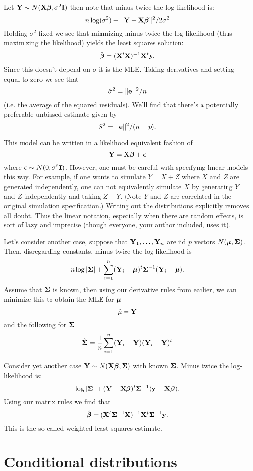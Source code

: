 Let $\mathbf{Y} \sim N(\mathbf{X} \boldsymbol{\beta}, \sigma^2 \mathbf{I})$ then note that 
minus twice the log-likelihood is:
$$
n\log(\sigma^2) + ||\mathbf{Y} - \mathbf{X} \boldsymbol{\beta}||^2 / 2\sigma^2
$$
Holding $\sigma^2$ fixed we see that minmizing minus twice
the log likelihood (thus maximizing the likelihood) yields
the least squares solution:
$$
\hat {\boldsymbol{\beta}} = (\mathbf{X}^t \mathbf{X})^{-1} \mathbf{X}^t \mathbf{y}.
$$
Since this doesn't depend on $\sigma$ it is the MLE. 
Taking derivatives and setting equal to zero we
see that 
$$
\hat \sigma^2 = ||\mathbf{e}||^2 / n
$$
(i.e. the average of the squared residuals). We'll
find that there's a potentially preferable unbiased
estimate given by
$$
S^2 = ||\mathbf{e}||^2 / (n - p).
$$

This model can be written in a  likelihood equivalent fashion
of  
$$
\mathbf{Y} = \mathbf{X} \boldsymbol{\beta} + \boldsymbol{\epsilon}
$$
where $\boldsymbol{\epsilon} \sim N(0, \sigma^2 \mathbf{I})$. However, one
must be careful with specifying linear models this way.
For example, if one wants to simulate $Y = X + Z$ where $X$ and $Z$ are generated
independently, one can not equivalently simulate $X$
by generating $Y$ and $Z$ independently and taking $Z - Y$.
(Note $Y$ and $Z$ are correlated in the original simulation specification.)
Writing out the distributions explicitly removes all doubt. 
Thus the linear notation, especially when there are random effects, is sort
of lazy and imprecise (though everyone, your author included, uses it). 


Let's consider another case, suppose that $\mathbf{Y}_1, \ldots, \mathbf{Y}_n$ are iid $p$ vectors
$N(\boldsymbol{\mu}, \boldsymbol{\Sigma})$. Then, disregarding constants, minus twice the log likelihood is
$$
n \log|\boldsymbol{\Sigma}| + \sum_{i=1}^n (\mathbf{Y}_i - \boldsymbol{\mu})^t \boldsymbol{\Sigma}^{-1} (\mathbf{Y}_i - \boldsymbol{\mu}).
$$
Assume that $\boldsymbol{\Sigma}$ is known, then using our derivative rules from earlier,
we can minimize this to obtain the MLE for $\boldsymbol{\mu}$
$$
\hat \mu = \bar {\mathbf{Y}} 
$$
and the following for $\boldsymbol{\Sigma}$
$$
\hat {\boldsymbol{\Sigma}} = \frac{1}{n} \sum_{i=1}^n (\mathbf{Y}_i - \bar {\mathbf{Y}}) (\mathbf{Y}_i -\bar {\mathbf{Y}})^t
$$


Consider yet another case $\mathbf{Y} \sim N(\mathbf{X}\boldsymbol{\beta}, \boldsymbol{\Sigma})$ with known $\boldsymbol{\Sigma}$.
Minus twice the log-likelihood is:
$$
\log |\boldsymbol{\Sigma}| + (\mathbf{Y} - \mathbf{X} \boldsymbol{\beta})^t \boldsymbol{\Sigma}^{-1} (\mathbf{y} - \mathbf{X} \boldsymbol{\beta}).
$$
Using our matrix rules we find that
$$
\hat {\boldsymbol{\beta}} = (\mathbf{X}^t \boldsymbol{\Sigma}^{-1} \mathbf{X})^{-1} \mathbf{X}^t \boldsymbol{\Sigma}^{-1}\mathbf{y}. 
$$
This is the so-called weighted least squares estimate. 


\section{Conditional distributions}


